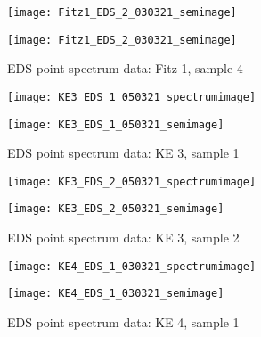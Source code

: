 \begin{figure}[H]
\centering
\begin{minipage}{.45\textwidth}
  \centering
  \texttt{[image: Fitz1\_EDS\_2\_030321\_semimage]}
\end{minipage}
\begin{minipage}{.45\textwidth}
  \centering
  \texttt{[image: Fitz1\_EDS\_2\_030321\_semimage]}
\end{minipage}
\caption[EDS point spectrum data: Fitz 1, sample 4]{EDS point spectrum data: Fitz 1, sample 4}
\label{fig:fitz1_point_eds_4}
\end{figure}



\begin{figure}[H]
\centering
\begin{minipage}{.45\textwidth}
  \centering
  \texttt{[image: KE3\_EDS\_1\_050321\_spectrumimage]}
\end{minipage}
\begin{minipage}{.45\textwidth}
  \centering
  \texttt{[image: KE3\_EDS\_1\_050321\_semimage]}
\end{minipage}
\caption[EDS point spectrum data: KE 3, sample 1]{EDS point spectrum data: KE 3, sample 1}
\label{fig:ke3_point_eds_1}
\end{figure}

\begin{figure}[H]
\centering
\begin{minipage}{.45\textwidth}
  \centering
  \texttt{[image: KE3\_EDS\_2\_050321\_spectrumimage]}
\end{minipage}
\begin{minipage}{.45\textwidth}
  \centering
  \texttt{[image: KE3\_EDS\_2\_050321\_semimage]}
\end{minipage}
\caption[EDS point spectrum data: KE 3, sample 2]{EDS point spectrum data: KE 3, sample 2}
\label{fig:ke3_point_eds_2}
\end{figure}




\begin{figure}[H]
\centering
\begin{minipage}{.45\textwidth}
  \centering
  \texttt{[image: KE4\_EDS\_1\_030321\_spectrumimage]}
\end{minipage}
\begin{minipage}{.45\textwidth}
  \centering
  \texttt{[image: KE4\_EDS\_1\_030321\_semimage]}
\end{minipage}
\caption[EDS point spectrum data: KE 4, sample 1]{EDS point spectrum data: KE 4, sample 1}
\label{fig:ke4_point_eds_1}
\end{figure}

